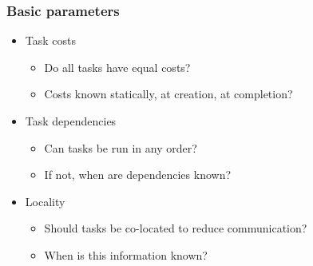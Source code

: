 \documentclass{beamer}
\begin{document}
\begin{frame}
  \frametitle{Basic parameters}
  
  \begin{itemize}
  \item Task costs
    \begin{itemize}
    \item Do all tasks have equal costs?
    \item Costs known statically, at creation, at completion?
    \end{itemize}
  \item Task dependencies
    \begin{itemize}
    \item Can tasks be run in any order?
    \item If not, when are dependencies known?
    \end{itemize}
  \item Locality
    \begin{itemize}
    \item Should tasks be co-located to reduce communication?
    \item When is this information known?
    \end{itemize}
  \end{itemize}
\end{frame}
\end{document}
